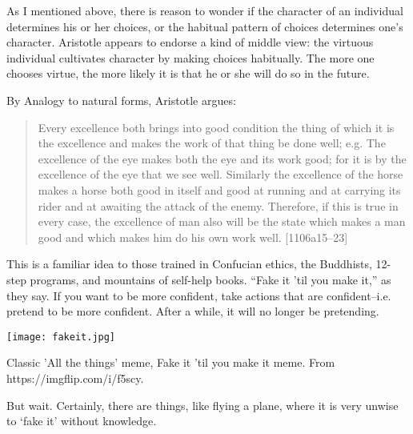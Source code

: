 As I mentioned above, there is reason to wonder if the character of an individual determines his or her choices, or the habitual pattern of choices determines one's character. Aristotle appears to endorse a kind of middle view: the virtuous individual cultivates character by making choices habitually. The more one chooses virtue, the more likely it is that he or she will do so in the future. 

By Analogy to natural forms, Aristotle argues:

\begin{quote}

Every excellence both brings into good condition the thing of which it is the excellence and makes the work of that thing be done well; e.g. The excellence of the eye makes both the eye and its work good; for it is by the excellence of the eye that we see well. Similarly the excellence of the horse makes a horse both good in itself and good at running and at carrying its rider and at awaiting the attack of the enemy. Therefore, if this is true in every case, the excellence of man also will be the state which makes a man good and which makes him do his own work well. [1106a15--23]
\end{quote}

This is a familiar idea to those trained in Confucian ethics, the Buddhists, 12-step programs, and mountains of self-help books. ``Fake it 'til you make it,'' as they say. If you want to be more confident, take actions that are confident--i.e. pretend to be more confident. After a while, it will no longer be pretending.\begin{marginfigure}\texttt{[image: fakeit.jpg]}\caption{Classic 'All the things' meme, Fake it 'til you make it meme. From  https://imgflip.com/i/f5scy.}\label{fig:fakeit}\end{marginfigure}

But wait. Certainly, there are things, like flying a plane, where it is very unwise to `fake it' without knowledge. 


